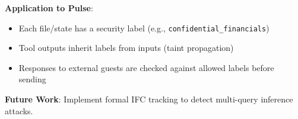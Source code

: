 \textbf{Application to Pulse}:
\begin{itemize}
    \item Each file/state has a security label (e.g., \texttt{confidential\_financials})
    \item Tool outputs inherit labels from inputs (taint propagation)
    \item Responses to external guests are checked against allowed labels before sending
\end{itemize}

\textbf{Future Work}: Implement formal IFC tracking to detect multi-query inference attacks.
